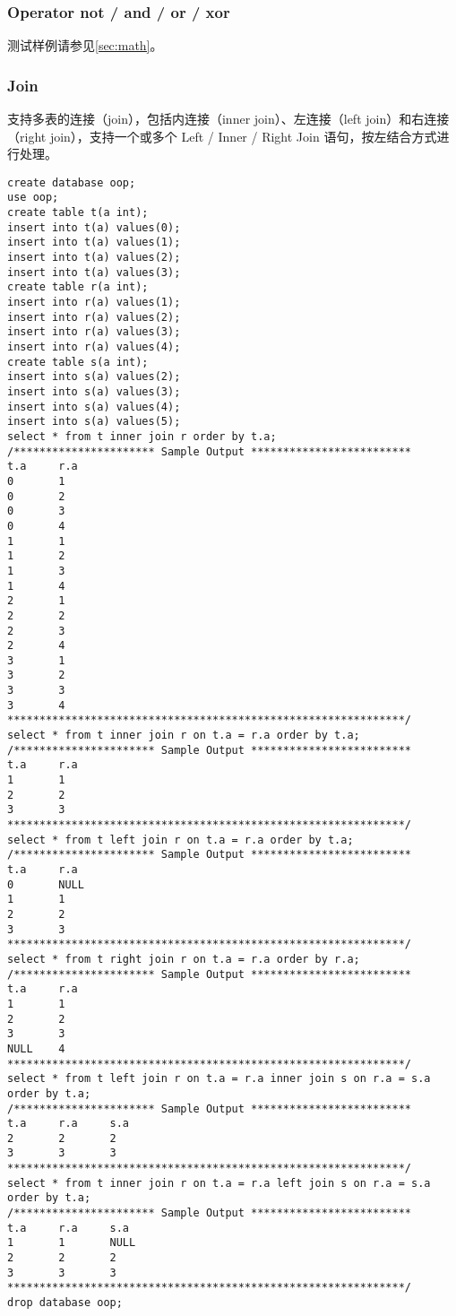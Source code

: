 \documentclass[12pt,a4paper]{article}
\begin{document}
\subsubsection{Operator not / and / or / xor }

测试样例请参见\cref{sec:math}。

\subsubsection{Join}

支持多表的连接（join），包括内连接（inner join）、左连接（left join）和右连接（right join），支持一个或多个 Left / Inner / Right Join 语句，按左结合方式进行处理。

\begin{lstlisting}
create database oop;
use oop;
create table t(a int); 
insert into t(a) values(0);
insert into t(a) values(1);
insert into t(a) values(2);
insert into t(a) values(3);
create table r(a int); 
insert into r(a) values(1);
insert into r(a) values(2);
insert into r(a) values(3);
insert into r(a) values(4);
create table s(a int); 
insert into s(a) values(2);
insert into s(a) values(3);
insert into s(a) values(4);
insert into s(a) values(5);
select * from t inner join r order by t.a; 
/********************** Sample Output *************************
t.a     r.a     
0       1       
0       2       
0       3       
0       4       
1       1       
1       2       
1       3       
1       4       
2       1       
2       2       
2       3       
2       4       
3       1       
3       2       
3       3       
3       4      
**************************************************************/
select * from t inner join r on t.a = r.a order by t.a; 
/********************** Sample Output *************************
t.a     r.a     
1       1       
2       2       
3       3   
**************************************************************/
select * from t left join r on t.a = r.a order by t.a; 
/********************** Sample Output *************************
t.a     r.a     
0       NULL    
1       1       
2       2       
3       3     
**************************************************************/
select * from t right join r on t.a = r.a order by r.a; 
/********************** Sample Output *************************
t.a     r.a     
1       1       
2       2       
3       3       
NULL    4  
**************************************************************/
select * from t left join r on t.a = r.a inner join s on r.a = s.a order by t.a; 
/********************** Sample Output *************************
t.a     r.a     s.a     
2       2       2       
3       3       3    
**************************************************************/
select * from t inner join r on t.a = r.a left join s on r.a = s.a order by t.a; 
/********************** Sample Output *************************
t.a     r.a     s.a     
1       1       NULL    
2       2       2       
3       3       3    
**************************************************************/
drop database oop;
\end{lstlisting}
\end{document}

